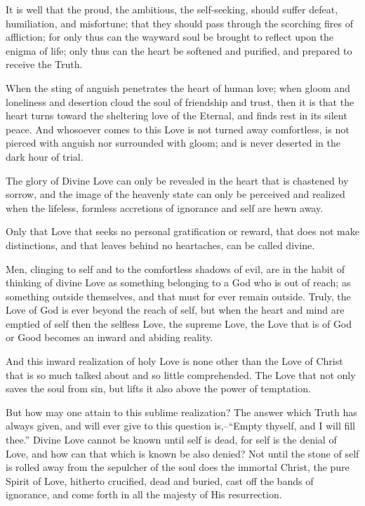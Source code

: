 \documentclass[12pt,oneside]{scrbook}
\begin{document}
  It is well that the proud, the ambitious, the self-seeking, should
  suffer defeat, humiliation, and misfortune; that they should pass
  through the scorching fires of affliction; for only thus can the wayward
  soul be brought to reflect upon the enigma of life; only thus can the
  heart be softened and purified, and prepared to receive the Truth.
  
  When the sting of anguish penetrates the heart of human love; when gloom
  and loneliness and desertion cloud the soul of friendship and trust,
  then it is that the heart turns toward the sheltering love of the
  Eternal, and finds rest in its silent peace. And whosoever comes to this
  Love is not turned away comfortless, is not pierced with anguish nor
  surrounded with gloom; and is never deserted in the dark hour of trial.
  
  The glory of Divine Love can only be revealed in the heart that is
  chastened by sorrow, and the image of the heavenly state can only be
  perceived and realized when the lifeless, formless accretions of
  ignorance and self are hewn away.
  
  Only that Love that seeks no personal gratification or reward, that does
  not make distinctions, and that leaves behind no heartaches, can be
  called divine.
  
  Men, clinging to self and to the comfortless shadows of evil, are in the
  habit of thinking of divine Love as something belonging to a God who is
  out of reach; as something outside themselves, and that must for ever
  remain outside. Truly, the Love of God is ever beyond the reach of self,
  but when the heart and mind are emptied of self then the selfless Love,
  the supreme Love, the Love that is of God or Good becomes an inward and
  abiding reality.
  
  And this inward realization of holy Love is none other than the Love of
  Christ that is so much talked about and so little comprehended. The Love
  that not only saves the soul from sin, but lifts it also above the power
  of temptation.
  
  But how may one attain to this sublime realization? The answer which
  Truth has always given, and will ever give to this question is,--``Empty
  thyself, and I will fill thee.'' Divine Love cannot be known until self
  is dead, for self is the denial of Love, and how can that which is known
  be also denied? Not until the stone of self is rolled away from the
  sepulcher of the soul does the immortal Christ, the pure Spirit of Love,
  hitherto crucified, dead and buried, cast off the bands of ignorance,
  and come forth in all the majesty of His resurrection.
  
\end{document}

